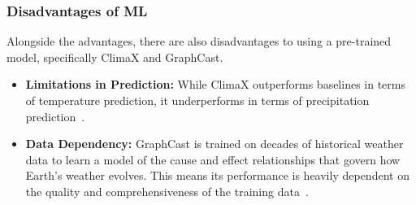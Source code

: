 \documentclass[../paper.tex]{subfiles}
\begin{document}
\subsubsection{Disadvantages of ML}
    Alongside the advantages, there are also disadvantages to using a pre-trained model, specifically ClimaX and GraphCast.
    \begin{itemize}
        \item \textbf{Limitations in Prediction:} While ClimaX outperforms baselines in terms of temperature prediction, it underperforms in terms of precipitation prediction~\cite{d3}.
        \item \textbf{Data Dependency:}
        GraphCast is trained on decades of historical weather data
        to learn a model of the cause and effect relationships that govern how Earth's
        weather evolves.
        This means its performance is heavily dependent on the quality and comprehensiveness of the training data~\cite{e5}.
    \end{itemize}
\end{document}
